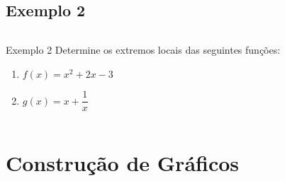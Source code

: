 \begin{frame}
\begin{columns}[onlytextwidth]
\begin{column}{0.45\textwidth}
\begin{figure}
      \end{figure}
    \end{column}
  \end{columns}
\end{frame}

\subsection{Exemplo 2}
\begin{frame}
  \begin{columns}[onlytextwidth]
    \begin{column}{0.65\textwidth}\vspace{-0.85cm}
      \begin{block}{Exemplo 2}
        Determine os extremos locais das seguintes funções:
      \end{block}
      \begin{enumerate}
        \item<only@+> $f(x) = x^{2} + 2x - 3$
        \item<only@+> $g(x) = x + \dfrac{1}{x}$
      \end{enumerate}
    \end{column}
    \begin{column}{0.35\textwidth}\vspace{-0.75cm}
    \end{column}
  \end{columns}
\end{frame}

\section{Construção de Gráficos}

